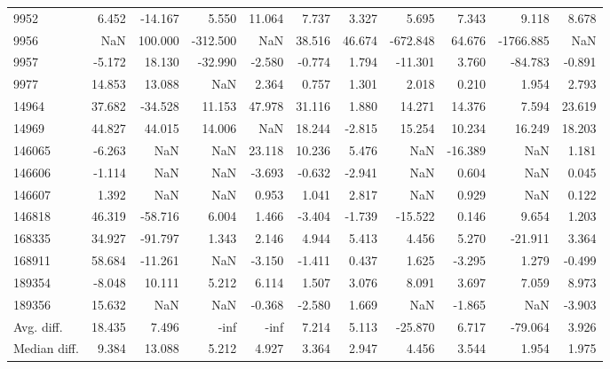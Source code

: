 \begin{tabular}{lrrrrrrrrrr}
9952 & 6.452 & -14.167 & 5.550 & 11.064 & 7.737 & 3.327 & 5.695 & 7.343 & 9.118 & 8.678 \\
9956 & NaN & 100.000 & -312.500 & NaN & 38.516 & 46.674 & -672.848 & 64.676 & -1766.885 & NaN \\
9957 & -5.172 & 18.130 & -32.990 & -2.580 & -0.774 & 1.794 & -11.301 & 3.760 & -84.783 & -0.891 \\
9977 & 14.853 & 13.088 & NaN & 2.364 & 0.757 & 1.301 & 2.018 & 0.210 & 1.954 & 2.793 \\
14964 & 37.682 & -34.528 & 11.153 & 47.978 & 31.116 & 1.880 & 14.271 & 14.376 & 7.594 & 23.619 \\
14969 & 44.827 & 44.015 & 14.006 & NaN & 18.244 & -2.815 & 15.254 & 10.234 & 16.249 & 18.203 \\
146065 & -6.263 & NaN & NaN & 23.118 & 10.236 & 5.476 & NaN & -16.389 & NaN & 1.181 \\
146606 & -1.114 & NaN & NaN & -3.693 & -0.632 & -2.941 & NaN & 0.604 & NaN & 0.045 \\
146607 & 1.392 & NaN & NaN & 0.953 & 1.041 & 2.817 & NaN & 0.929 & NaN & 0.122 \\
146818 & 46.319 & -58.716 & 6.004 & 1.466 & -3.404 & -1.739 & -15.522 & 0.146 & 9.654 & 1.203 \\
168335 & 34.927 & -91.797 & 1.343 & 2.146 & 4.944 & 5.413 & 4.456 & 5.270 & -21.911 & 3.364 \\
168911 & 58.684 & -11.261 & NaN & -3.150 & -1.411 & 0.437 & 1.625 & -3.295 & 1.279 & -0.499 \\
189354 & -8.048 & 10.111 & 5.212 & 6.114 & 1.507 & 3.076 & 8.091 & 3.697 & 7.059 & 8.973 \\
189356 & 15.632 & NaN & NaN & -0.368 & -2.580 & 1.669 & NaN & -1.865 & NaN & -3.903 \\
Avg. diff. & 18.435 & 7.496 & -inf & -inf & 7.214 & 5.113 & -25.870 & 6.717 & -79.064 & 3.926 \\
Median diff. & 9.384 & 13.088 & 5.212 & 4.927 & 3.364 & 2.947 & 4.456 & 3.544 & 1.954 & 1.975 \\
\bottomrule
\end{tabular}

